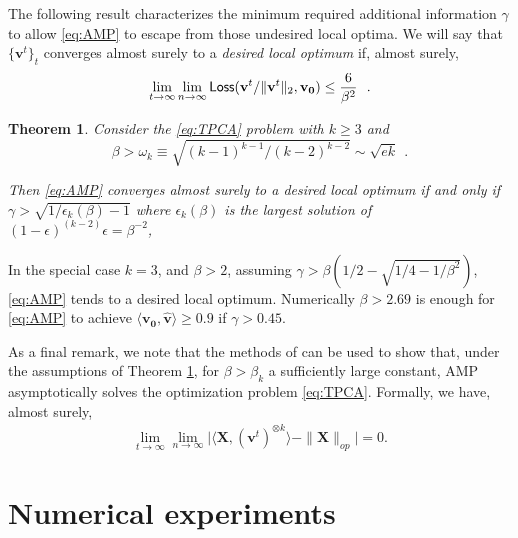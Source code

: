 \documentclass[11pt]{article}
\newtheorem{theorem}{Theorem}
\theoremstyle{definition}
\def\Loss{{\sf Loss}}
\def\<{\langle}
\def\>{\rangle}
\def\bv{\mathbf{v}}
\def\hbv{\mathbf{\widehat{v}}}
\def\bvz{\mathbf{v_0}}
\def\bX{\mathbf{X}}
\begin{document}
The following result characterizes the 
minimum required additional information $\gamma$ to allow \ref{eq:AMP}
to escape from those undesired local optima. 
We will say that $\{ \bv^t\}_t$ converges almost surely to a {\em desired local optimum} if,
almost surely, 
%
 \begin{equation*}
\lim_{t \to \infty} \lim_{n \to \infty}  \Loss(\bv^t /
\|\bv^t\|_2,\bvz)\le \frac{6}{\beta^2}~~.
\end{equation*}

\begin{theorem}\label{thm:AMPisGood}
Consider the \ref{eq:TPCA} problem with $k \geq 3$
and $$\beta>\omega_k \equiv \sqrt{(k-1)^{k-1} / (k-2)^{k-2}} \sim
\sqrt{ek}~~.$$ 

Then \ref{eq:AMP} converges almost surely to a desired local optimum
if and only if $\gamma > \sqrt{1/\epsilon_k(\beta)-1}$ where
$\epsilon_k(\beta)$ is the largest solution of $(1-\epsilon)^{(k-2)}\epsilon =
\beta^{-2}$, 
\end{theorem}
%
In the special case $k = 3$,  and $\beta>2$, assuming  $\gamma >\beta(1/2 - \sqrt{1/4 - 1/\beta^2})$, \ref{eq:AMP} tends to a desired local optimum. Numerically $\beta>2.69$ is enough for \ref{eq:AMP} to achieve $\<\bvz,\hbv\>\geq 0.9$ if $\gamma > 0.45$. 


As a final remark, we note that the methods of \cite{montanari2014non}
can be used to show that, under the assumptions of Theorem
\ref{thm:AMPisGood}, for $\beta>\beta_k$ a sufficiently large constant, 
AMP asymptotically solves the optimization problem \ref{eq:TPCA}.
Formally, we have, almost surely, 
%
\begin{align}\label{eq:upperBoundRayleight}
%
\lim_{t \to \infty} \lim_{n \to \infty} \Big|\<\bX,\left (\bv^{t}\right)^{\otimes k}\>-\| \bX\|_{op}\Big|=0.
%
\end{align}

%
\section{Numerical experiments}\label{sec:num}
\end{document}
